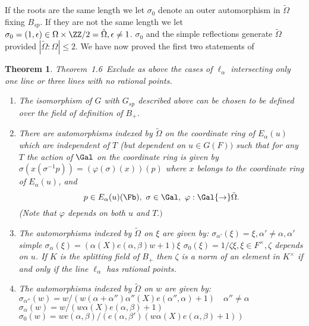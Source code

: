 \documentclass{memo-l}
\newtheorem{theorem}{Theorem}[section]
\theoremstyle{definition}
\theoremstyle{remark}
\numberwithin{section}{chapter}
\numberwithin{equation}{chapter}
\begin{document}
   If the roots are the same length we let ${\sigma}_{0}$ denote an outer
automorphism in $\tilde{\Omega}$ fixing $B_{sp}$.  If they are not the same
length we let ${\sigma}_{0}  =  (1,{\epsilon})  \in  {\Omega} \times
{\ZZ}/2  =  \tilde{\Omega} , {\epsilon} \ne 1$.  ${\sigma}_{0}$ and the simple
reflections generate $\tilde{\Omega}$ provided $|\tilde\Omega:\Omega|\le2$.
We have now proved the first two
statements of

\medpagebreak

\begin{theorem}{Theorem\ 1.6}\ Exclude as above the cases of
${\ell}_{{\alpha}}$ intersecting only one line or three lines with no
rational points.

\medpagebreak
\begin{enumerate}[label=\alph*)]
\item The isomorphism of $G$ with $G_{sp}$ described above can be chosen to be
defined over the field of definition of $B_{+}$.
\medpagebreak
\item There are automorphisms indexed by $\tilde{\Omega}$
on the coordinate ring of
$E_{{\alpha}}(u)$ which are independent of $T$ (but dependent on $u  \in
G(F))$ such that for any $T$ the action of $\Gal$ on the
coordinate ring is given by ${\sigma}(x({\sigma}^{-1}p))  =
({\varphi}({\sigma})(x))(p)$ where $x$ belongs to the coordinate ring
of $E_{{\alpha}}(u)$, and $$p  \in  E_{{\alpha}}(u)(\Fb), \
{\sigma}  \in
\Gal,\ {\varphi}: \Gal {\to} \tilde{\Omega} .$$ (Note that
${\varphi}$ depends on both $u$ and $T.)$
\medpagebreak
\item The automorphisms indexed by $\tilde{\Omega}$ on ${\xi}$ are given by:
 \newline
${\sigma}_{{\alpha}'}({\xi})  =  {\xi}, {\alpha}'  \ne {\alpha}, {\alpha}'$
simple
 \newline
${\sigma}_{{\alpha}}({\xi})  =  ({\alpha}(X)e({\alpha},{\beta})w+1){\xi}$
 \newline
${\sigma}_{0}({\xi})  =  1/{\zeta}{\xi}, {\xi}  \in  F^{\times}, {\zeta}$
depends on $u$.  If $K$ is the splitting field of $B_{+}$ then ${\zeta}$ is
a norm of an element in $K^{\times}$ if and only if the line ${\ell}_{{\alpha}}$
has rational points.
\medpagebreak
\item The automorphisms indexed by $\tilde{\Omega}$ on $w$ are given by:
 \newline
${\sigma}_{{\alpha}''}(w)  =
w/(w({\alpha}+{\alpha}''){\alpha}''(X)e({\alpha}'',{\alpha})+1) \quad
{\alpha}''  \ne
{\alpha}$
 \newline
${\sigma}_{{\alpha}}(w)  =  w/(w{\alpha}(X)e({\alpha},{\beta})+1)$
 \newline
${\sigma}_{0}(w)  =
we({\alpha},{\beta})/(e({\alpha},{\beta}')(w{\alpha}(X)e({\alpha},{\beta})+1))$
\end{enumerate}
\end{theorem}
\end{document}
